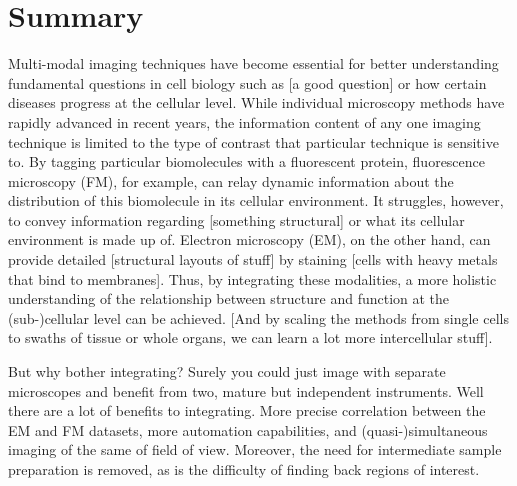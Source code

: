 \chapter*{Summary}







Multi-modal imaging techniques have become essential for better understanding fundamental questions in cell biology such as [a good question] or how certain diseases progress at the cellular level. While individual microscopy methods have rapidly advanced in recent years, the information content of any one imaging technique is limited to the type of contrast that particular technique is sensitive to. By tagging particular biomolecules with a fluorescent protein, fluorescence microscopy (FM), for example, can relay dynamic information about the distribution of this biomolecule in its cellular environment. It struggles, however, to convey information regarding [something structural] or what its cellular environment is made up of. Electron microscopy (EM), on the other hand, can provide detailed [structural layouts of stuff] by staining [cells with heavy metals that bind to membranes]. Thus, by integrating these modalities, a more holistic understanding of the relationship between structure and function at the (sub-)cellular level can be achieved. [And by scaling the methods from single cells to swaths of tissue or whole organs, we can learn a lot more intercellular stuff].

But why bother integrating? Surely you could just image with separate microscopes and benefit from two, mature but independent instruments. Well there are a lot of benefits to integrating. More precise correlation between the EM and FM datasets, more automation capabilities, and (quasi-)simultaneous imaging of the same of field of view. Moreover, the need for intermediate sample preparation is removed, as is the difficulty of finding back regions of interest.

